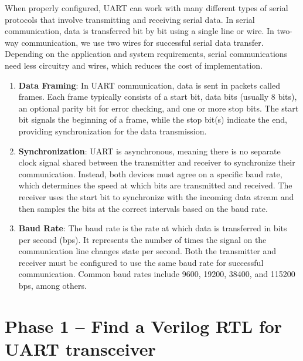 \documentclass{article}
\begin{document}
                When properly configured, UART can work with many different types of serial protocols that involve transmitting and receiving serial data. In serial communication, data is transferred bit by bit using a single line or wire. In two-way communication, we use two wires for successful serial data transfer. Depending on the application and system requirements, serial communications need less circuitry and wires, which reduces the cost of implementation.


                    \begin{enumerate}
                        \item \textbf{Data Framing}: In UART communication, data is sent in packets called frames. Each frame typically consists of a start bit, data bits (usually 8 bits), an optional parity bit for error checking, and one or more stop bits. The start bit signals the beginning of a frame, while the stop bit(s) indicate the end, providing synchronization for the data transmission.
                        
                        \item \textbf{Synchronization}: UART is asynchronous, meaning there is no separate clock signal shared between the transmitter and receiver to synchronize their communication. Instead, both devices must agree on a specific baud rate, which determines the speed at which bits are transmitted and received. The receiver uses the start bit to synchronize with the incoming data stream and then samples the bits at the correct intervals based on the baud rate.
                        
                        \item \textbf{Baud Rate}: The baud rate is the rate at which data is transferred in bits per second (bps). It represents the number of times the signal on the communication line changes state per second. Both the transmitter and receiver must be configured to use the same baud rate for successful communication. Common baud rates include 9600, 19200, 38400, and 115200 bps, among others.

                    \end{enumerate}
                            
                    \section{Phase 1 – Find a Verilog RTL for UART transceiver}
\end{document}
